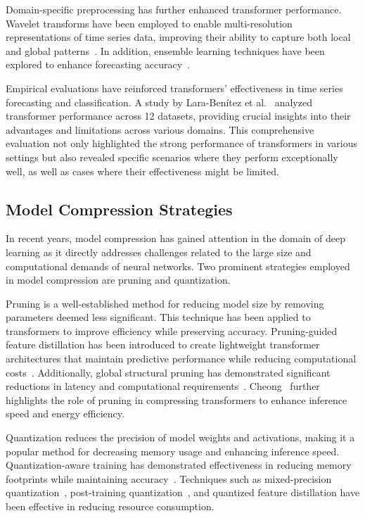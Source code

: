 Domain-specific preprocessing has further enhanced transformer performance. Wavelet transforms have been employed to enable multi-resolution representations of time series data, improving their ability to capture both local and global patterns~\cite{Tao2023}. In addition, ensemble learning techniques have been explored to enhance forecasting accuracy~\cite{Li2024}.

Empirical evaluations have reinforced transformers' effectiveness in time series forecasting and classification. A study by Lara-Benítez et al.~\cite{LaraBenitez2021} analyzed transformer performance across 12 datasets, providing crucial insights into their advantages and limitations across various domains. This comprehensive evaluation not only highlighted the strong performance of transformers in various settings but also revealed specific scenarios where they perform exceptionally well, as well as cases where their effectiveness might be limited.

\subsection{Model Compression Strategies}

In recent years, model compression has gained attention in the domain of deep learning as it directly addresses challenges related to the large size and computational demands of neural networks. Two prominent strategies employed in model compression are pruning and quantization. 

Pruning is a well-established method for reducing model size by removing parameters deemed less significant. This technique has been applied to transformers to improve efficiency while preserving accuracy. Pruning-guided feature distillation has been introduced to create lightweight transformer architectures that maintain predictive performance while reducing computational costs~\cite{Kim2024}. Additionally, global structural pruning has demonstrated significant reductions in latency and computational requirements~\cite{Liu2023}. Cheong~\cite{Cheong2019} further highlights the role of pruning in compressing transformers to enhance inference speed and energy efficiency.

Quantization reduces the precision of model weights and activations, making it a popular method for decreasing memory usage and enhancing inference speed. Quantization-aware training has demonstrated effectiveness in reducing memory footprints while maintaining accuracy~\cite{Zhu2023}. Techniques such as mixed-precision quantization~\cite{Xu2021}, post-training quantization~\cite{Liu2023}, and quantized feature distillation have been effective in reducing resource consumption.


